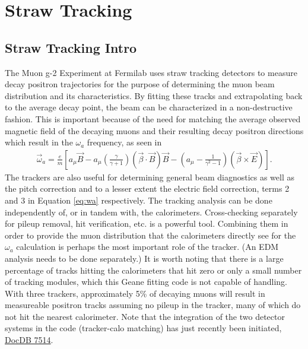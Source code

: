 \chapter{Straw Tracking}
\label{chapter:Straw Tracking}
\thispagestyle{myheadings} %


\graphicspath{ {Body/Figures/TrackingFigures/} {Body/Figures/TrackingFigures/MainPlots/} {Body/Figures/TrackingFigures/MainPlots/PlanePlots/} {Body/Figures/TrackingFigures/MainPlots/PullPlots/} {Body/Figures/TrackingFigures/MainPlots/Residuals/} {Body/Figures/TrackingFigures/eLoss/} {Body/Figures/TrackingFigures/CoordSys/} {Body/Figures/TrackingFigures/TrackerPics/} {Body/Figures/TrackingFigures/Field/} {Body/Figures/TrackingFigures/TrackingFlow/} {Body/Figures/TrackingFigures/LeftRight/} {Body/Figures/TrackingFigures/Misc/}}

\section{Straw Tracking Intro}
\label{sec:StrawTrackingIntro}


  The Muon g-2 Experiment at Fermilab uses straw tracking detectors to measure decay positron trajectories for the purpose of determining the muon beam distribution and its characteristics. By fitting these tracks and extrapolating back to the average decay point, the beam can be characterized in a non-destructive fashion. This is important because of the need for matching the average observed magnetic field of the decaying muons and their resulting decay positron directions which result in the $\omega_{a}$ frequency, as seen in
        \begin{align} \label{eq:wa}
            \vec{\omega}_{a} = \frac{e}{m} [a_{\mu}\vec{B} - a_{\mu} (\frac{\gamma}{\gamma+1})(\vec{\beta} \cdot \vec{B})\vec{B} - (a_{\mu} - \frac{1}{\gamma^{2}-1})(\vec{\beta} \times \vec{E}) ].
        \end{align}
  The trackers are also useful for determining general beam diagnostics as well as the pitch correction and to a lesser extent the electric field correction, terms 2 and 3 in Equation \ref{eq:wa} respectively. The tracking analysis can be done independently of, or in tandem with, the calorimeters. Cross-checking separately for pileup removal, hit verification, etc. is a powerful tool. Combining them in order to provide the muon distribution that the calorimeters directly see for the $\omega_{a}$ calculation is perhaps the most important role of the tracker. (An EDM analysis needs to be done separately.) It is worth noting that there is a large percentage of tracks hitting the calorimeters that hit zero or only a small number of tracking modules, which this Geane fitting code is not capable of handling. With three trackers, approximately 5\% of decaying muons will result in measureable positron tracks assuming no pileup in the tracker, many of which do not hit the nearest calorimeter. Note that the integration of the two detector systems in the code (tracker-calo matching) has just recently been initiated, \href{https://gm2-docdb.fnal.gov/cgi-bin/private/ShowDocument?docid=7514}{DocDB 7514}.

